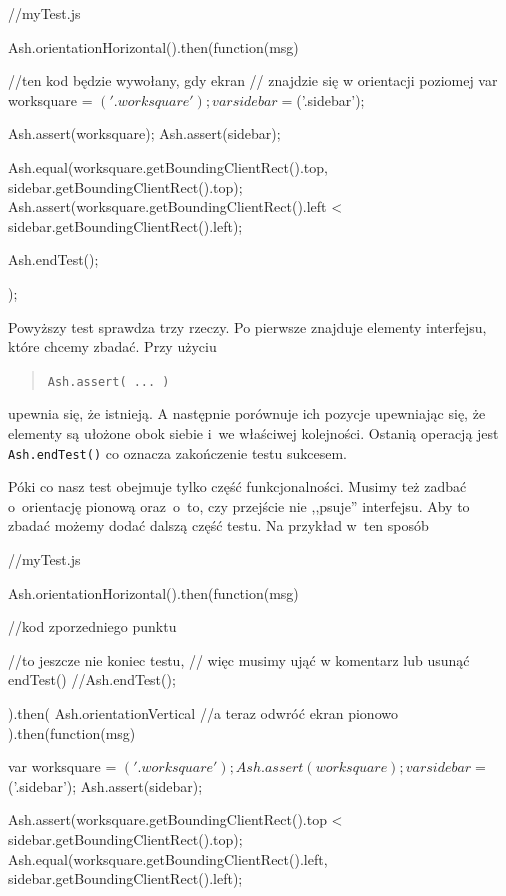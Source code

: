 \documentclass[brudnopis]{xmgr}
\begin{document}
\begin{enumerate}
 \begin{javascriptcode}
  //myTest.js

  Ash.orientationHorizontal().then(function(msg){
     //ten kod będzie wywołany, gdy ekran 
     // znajdzie się w orientacji poziomej
      var worksquare = $('.worksquare');
      var sidebar = $('.sidebar');

      Ash.assert(worksquare);
      Ash.assert(sidebar);

      Ash.equal(worksquare.getBoundingClientRect().top,
           sidebar.getBoundingClientRect().top);
     Ash.assert(worksquare.getBoundingClientRect().left <
           sidebar.getBoundingClientRect().left);

      Ash.endTest();
    });  
\end{javascriptcode}

Powyższy test sprawdza trzy rzeczy. Po pierwsze znajduje elementy interfejsu, które chcemy zbadać. Przy użyciu 

\begin{quote}
  \texttt{Ash.assert( ... )} 
\end{quote}

upewnia się, że istnieją. A następnie porównuje ich pozycje upewniając się, że elementy są ułożone obok siebie i~we właściwej kolejności. Ostanią operacją jest \texttt{Ash.endTest()} co oznacza zakończenie testu sukcesem.

Póki co nasz test obejmuje tylko część funkcjonalności. Musimy też zadbać o~orientację pionową oraz~o~to, czy przejście nie ,,psuje'' interfejsu. Aby to zbadać możemy dodać dalszą część testu. Na przykład w~ten sposób

 \begin{javascriptcode}
  //myTest.js

  Ash.orientationHorizontal().then(function(msg){
       //kod zporzedniego punktu

      //to jeszcze nie koniec testu, 
      //  więc musimy ująć w komentarz lub usunąć endTest()
      //Ash.endTest();
  }).then(
      Ash.orientationVertical //a teraz odwróć ekran pionowo
    ).then(function(msg){
      var worksquare = $('.worksquare');
      Ash.assert(worksquare);
      
      var sidebar = $('.sidebar');
      Ash.assert(sidebar);

      Ash.assert(worksquare.getBoundingClientRect().top <
sidebar.getBoundingClientRect().top);
      Ash.equal(worksquare.getBoundingClientRect().left,
sidebar.getBoundingClientRect().left);        

}
\end{javascriptcode}
\end{enumerate}
\end{document}
